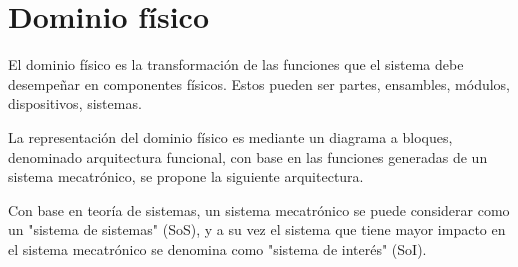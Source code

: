 \section{Dominio físico}
El dominio físico es la transformación de las funciones que el sistema debe desempeñar en componentes físicos. Estos pueden ser partes, ensambles, módulos, dispositivos, sistemas.

La representación del dominio físico es mediante un diagrama a bloques, denominado arquitectura funcional, con base en las funciones generadas de un sistema mecatrónico, se propone la siguiente arquitectura. 

Con base en teoría de sistemas, un sistema mecatrónico se puede considerar como un "sistema de sistemas" (SoS), y a su vez el sistema que tiene mayor impacto en el sistema mecatrónico se denomina como "sistema de interés" (SoI).